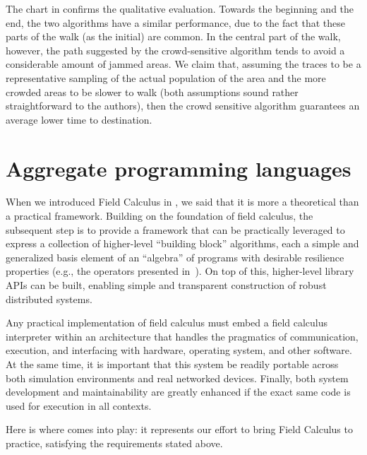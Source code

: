 \documentclass[12pt,a4paper,twoside,openright]{book}
\begin{document}
The chart in  confirms the qualitative evaluation.
%
Towards the beginning and the end, the two algorithms have a similar performance, due to the fact that these parts of the walk (as the initial) are common.
%
In the central part of the walk, however, the path suggested by the crowd-sensitive algorithm tends to avoid a considerable amount of jammed areas.
%
We claim that, assuming the traces to be a representative sampling of the actual population of the area and the more crowded areas to be slower to walk (both assumptions sound rather straightforward to the authors), then the crowd sensitive algorithm guarantees an average lower time to destination.

\chapter{Aggregate programming languages}

When we introduced Field Calculus in , we said that it is more a theoretical than a practical framework.
%
Building on the foundation of field calculus, the subsequent step is to provide a framework that can be practically leveraged to express a collection of higher-level ``building block'' algorithms, each a simple and generalized basis element of an ``algebra'' of programs with desirable resilience properties (e.g., the operators presented in~\cite{BV-FOCAS2014}).
%
On top of this, higher-level library APIs can be built, enabling simple and transparent construction of robust distributed systems.

Any practical implementation of field calculus must embed a field calculus interpreter within an architecture that handles the pragmatics of communication, execution, and interfacing with hardware, operating system, and other software.
%
At the same time, it is important that this system be readily portable across both simulation environments and real networked devices.
%
Finally, both system development and maintainability are greatly enhanced if the exact same code is used for execution in all contexts.

Here is where \protelis{} comes into play: it represents our effort to bring Field Calculus to practice, satisfying the requirements stated above.
\end{document}
